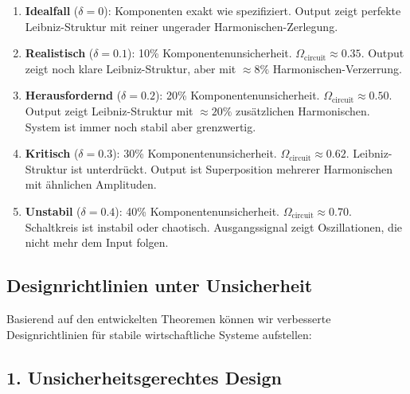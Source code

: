 \documentclass[a4paper,12pt,twoside]{report}
\theoremstyle{definition}
\begin{document}
\begin{enumerate}
    \item \textbf{Idealfall} ($\delta = 0$): Komponenten exakt wie spezifiziert. Output zeigt perfekte Leibniz-Struktur mit reiner ungerader Harmonischen-Zerlegung.
    
    \item \textbf{Realistisch} ($\delta = 0.1$): 10\% Komponentenunsicherheit. $\Omega_{\text{circuit}} \approx 0.35$. Output zeigt noch klare Leibniz-Struktur, aber mit $\approx 8\%$ Harmonischen-Verzerrung.
    
    \item \textbf{Herausfordernd} ($\delta = 0.2$): 20\% Komponentenunsicherheit. $\Omega_{\text{circuit}} \approx 0.50$. Output zeigt Leibniz-Struktur mit $\approx 20\%$ zusätzlichen Harmonischen. System ist immer noch stabil aber grenzwertig.
    
    \item \textbf{Kritisch} ($\delta = 0.3$): 30\% Komponentenunsicherheit. $\Omega_{\text{circuit}} \approx 0.62$. Leibniz-Struktur ist unterdrückt. Output ist Superposition mehrerer Harmonischen mit ähnlichen Amplituden.
    
    \item \textbf{Unstabil} ($\delta = 0.4$): 40\% Komponentenunsicherheit. $\Omega_{\text{circuit}} \approx 0.70$. Schaltkreis ist instabil oder chaotisch. Ausgangssignal zeigt Oszillationen, die nicht mehr dem Input folgen.
\end{enumerate}

\subsection{Designrichtlinien unter Unsicherheit}

Basierend auf den entwickelten Theoremen können wir verbesserte Designrichtlinien für stabile wirtschaftliche Systeme aufstellen:

\subsection{1. Unsicherheitsgerechtes Design}
\end{document}
